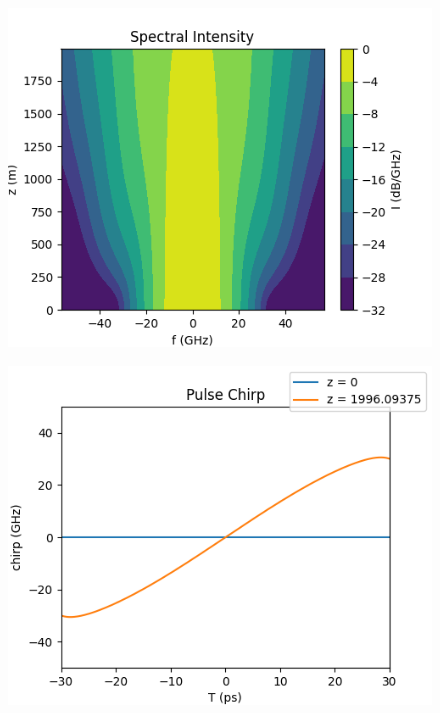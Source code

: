 \documentclass[10pt, a4paper, twocolumn]{article} %
\begin{document}
\begin{figure}%
    \includegraphics[width=\linewidth]{plots/plotFreqDbFL2D.png}
    \caption{}
    \label{trial1FreqDbFL2D}
\end{figure}

\begin{figure}
    \includegraphics[width=\linewidth]{plots/plotChirpFL.png}
    \caption{}
    \label{trial1ChirpFL}
\end{figure}
\end{document}
